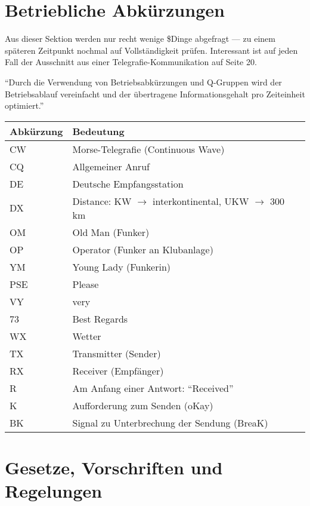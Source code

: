 \documentclass[11pt,BCOR=8.5mm]{scrartcl}
\begin{document}
\section{Betriebliche Abkürzungen}
Aus dieser Sektion werden nur recht wenige \$Dinge abgefragt --- zu
einem späteren Zeitpunkt nochmal auf Vollständigkeit prüfen. Interessant
ist auf jeden Fall der Ausschnitt aus einer Telegrafie-Kommunikation auf
Seite 20.

"`Durch die Verwendung von Betriebsabkürzungen und Q-Gruppen wird der
Betriebsablauf vereinfacht und der übertragene Informationsgehalt pro
Zeiteinheit optimiert."'

\begin{table}[h]
  \centering
  \begin{tabular}{| l | l | }
  \hline
  Abkürzung & Bedeutung \\
  \hline
  \hline
  CW & Morse-Telegrafie (Continuous Wave) \\
  \hline
  CQ & Allgemeiner Anruf \\
  \hline
  DE & Deutsche Empfangsstation \\
  \hline
  DX & Distance: KW $\rightarrow$ interkontinental, UKW $\rightarrow$ 
	  300 km \\
  \hline
  OM & Old Man (Funker) \\
  \hline
  OP & Operator (Funker an Klubanlage) \\
  \hline
  YM & Young Lady (Funkerin) \\
  \hline
  PSE & Please \\
  \hline
  VY & very \\
  \hline
  73 & Best Regards \\
  \hline
  WX & Wetter \\
  \hline
  TX & Transmitter (Sender) \\
  \hline
  RX & Receiver (Empfänger) \\
  \hline
  R & Am Anfang einer Antwort: "`Received"' \\
  \hline
  K & Aufforderung zum Senden (oKay) \\
  \hline
  BK & Signal zu Unterbrechung der Sendung (BreaK) \\
  \hline
\end{tabular}
\end{table}
 

\section{Gesetze, Vorschriften und Regelungen}
\end{document}
